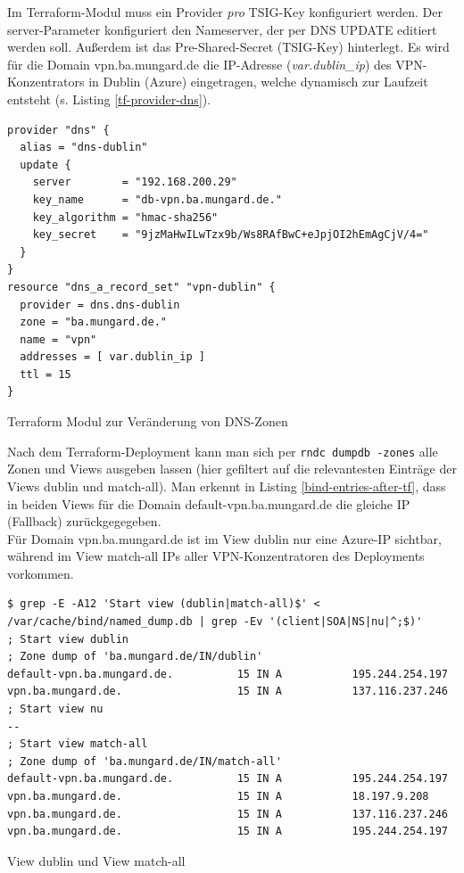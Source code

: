 Im Terraform-Modul muss ein Provider \textit{pro} \gls{TSIG}-Key konfiguriert werden. Der server-Parameter konfiguriert den Nameserver, der per \gls{DNS} UPDATE editiert werden soll. Außerdem ist das Pre-Shared-Secret (\gls{TSIG}-Key) hinterlegt. Es wird für die Domain vpn.ba.mungard.de die IP-Adresse (\textit{var.dublin\_ip}) des \gls{VPN-Konzentrator}s in Dublin (Azure) eingetragen, welche dynamisch zur Laufzeit entsteht (s. Listing \ref{tf-provider-dns}).
\begin{listing}[h]
\begin{verbatim}
provider "dns" {
  alias = "dns-dublin"
  update {
    server        = "192.168.200.29"
    key_name      = "db-vpn.ba.mungard.de."
    key_algorithm = "hmac-sha256"
    key_secret    = "9jzMaHwILwTzx9b/Ws8RAfBwC+eJpjOI2hEmAgCjV/4="
  }
}
resource "dns_a_record_set" "vpn-dublin" {
  provider = dns.dns-dublin
  zone = "ba.mungard.de."
  name = "vpn"
  addresses = [ var.dublin_ip ]
  ttl = 15
}
\end{verbatim}
\caption{Terraform Modul zur Veränderung von DNS-Zonen}
\label{tf-provider-dns}
\end{listing}\FloatBarrier
Nach dem Terraform-\gls{Deployment} kann man sich per \texttt{rndc dumpdb -zones} alle Zonen und \gls{View}s ausgeben lassen (hier gefiltert auf die relevantesten Einträge der \gls{View}s \glqq dublin\grqq{} und \glqq match-all\grqq{}). Man erkennt in Listing \ref{bind-entries-after-tf}, dass in beiden \gls{View}s für die Domain default-vpn.ba.mungard.de die gleiche IP (\glqq \gls{Fallback}\grqq{}) zurückgegegeben.\\
Für Domain vpn.ba.mungard.de ist im \gls{View} \glqq dublin\grqq{} nur eine Azure-IP sichtbar, während im \gls{View} \glqq match-all\grqq{} IPs aller \gls{VPN-Konzentrator}en des \gls{Deployment}s vorkommen.
\begin{listing}[h]
\begin{verbatim}
$ grep -E -A12 'Start view (dublin|match-all)$' < /var/cache/bind/named_dump.db | grep -Ev '(client|SOA|NS|nu|^;$)'
; Start view dublin
; Zone dump of 'ba.mungard.de/IN/dublin'
default-vpn.ba.mungard.de.          15 IN A           195.244.254.197
vpn.ba.mungard.de.                  15 IN A           137.116.237.246
; Start view nu
--
; Start view match-all
; Zone dump of 'ba.mungard.de/IN/match-all'
default-vpn.ba.mungard.de.          15 IN A           195.244.254.197
vpn.ba.mungard.de.                  15 IN A           18.197.9.208
vpn.ba.mungard.de.                  15 IN A           137.116.237.246
vpn.ba.mungard.de.                  15 IN A           195.244.254.197

\end{verbatim}
\caption{View \glqq dublin\grqq{} und View \glqq match-all\grqq{}}
\label{bind-entries-after-tf}
\end{listing}\FloatBarrier

